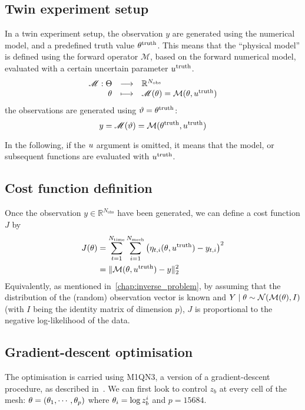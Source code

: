 \documentclass[../../Main_ManuscritThese.tex]{subfiles}
\newcommand{\zob}{z_b}
\begin{document}
\subsection{Twin experiment setup}
In a twin experiment setup, the observation $y$ are generated using
the numerical model, and a predefined truth value
$\theta^{\mathrm{truth}}$.  This means that the ``physical model'' is
defined using the forward operator $\mathscr{M}$, based on the forward
numerical model, evaluated with a certain uncertain parameter
$u^{\mathrm{truth}}$.
\begin{equation}
  \label{eq:twin_exp}
  \begin{array}{rcl}
    \mathscr{M}: \Theta &\longrightarrow & \mathbb{R}^{N_{\mathrm{obs}}} \\
    \theta & \longmapsto &\mathscr{M}(\theta) = \mathcal{M}(\theta, u^{\mathrm{truth}})
  \end{array}
\end{equation}
the observations are generated using $\vartheta=\theta^{\mathrm{truth}}$:
\begin{equation}
  y = \mathscr{M}(\vartheta) = \mathcal{M}(\theta^{\mathrm{truth}}, u^{\mathrm{truth}})
\end{equation}

In the following, if the $u$ argument is omitted, it means that the
model, or subsequent functions are evaluated with
$u^{\mathrm{truth}}$.
\subsection{Cost function definition}
Once the observation $y \in \mathbb{R}^{N_{\mathrm{obs}}}$ have been generated, we can
define a cost function $J$ by
\begin{align}
  \label{eq:cost_fun_definition}
  J(\theta) &= \sum_{t=1}^{ N_{\mathrm{time}}}\sum_{i=1}^{N_{\mathrm{mesh}}}  \left(\eta_{t,i}(\theta,u^{\mathrm{truth}}) - y_{t, i}\right)^2 \\
         &= \|\mathcal{M}(\theta,u^{\mathrm{truth}}) - y\|_2^2
\end{align}
Equivalently, as mentioned in~\cref{chap:inverse_problem}, by assuming
that the distribution of the (random) observation vector is known and
$Y \mid \theta \sim \mathcal{N}(\mathcal{M}(\theta), I)$ (with $I$ being the
identity matrix of dimension $p$), $J$ is proportional to the negative
log-likelihood of the data.

\subsection{Gradient-descent optimisation}
\label{ssec:optim_gradient}
The optimisation is carried using M1QN3, a version of a
gradient-descent procedure, as described
in~\cite{gilbert_numerical_1989}. We can first look to control $\zob$
at every cell of the mesh: $\theta = (\theta_1,\cdots, \theta_p)$ where
$\kk_i = \log\zob^i$ and $p=\num{15684}$.
\end{document}
